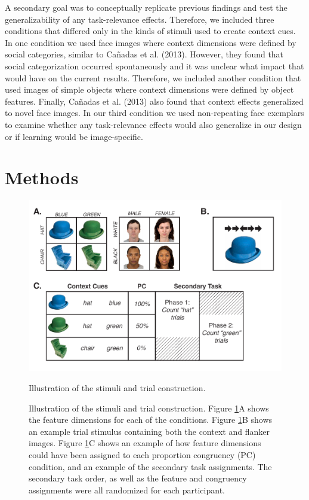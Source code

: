 \documentclass[]{DissertateCUNY}
\begin{document}
A secondary goal was to conceptually replicate previous findings and
test the generalizability of any task-relevance effects. Therefore, we
included three conditions that differed only in the kinds of stimuli
used to create context cues. In one condition we used face images where
context dimensions were defined by social categories, similar to Cañadas
et al. (2013). However, they found that social categorization occurred
spontaneously and it was unclear what impact that would have on the
current results. Therefore, we included another condition that used
images of simple objects where context dimensions were defined by object
features. Finally, Cañadas et al. (2013) also found that context effects
generalized to novel face images. In our third condition we used
non-repeating face exemplars to examine whether any task-relevance
effects would also generalize in our design or if learning would be
image-specific.

\hypertarget{methods-7}{%
\section{Methods}\label{methods-7}}

\begin{figure}
  \centering
  \includegraphics[width=5in]{figures/TRtask.pdf}
  \caption{Illustration of the stimuli and trial construction.}
  \caption*{Illustration of the stimuli and trial construction. Figure \ref{TRfigure1}A shows the feature dimensions for each of the conditions. Figure \ref{TRfigure1}B shows an example trial stimulus containing both the context and flanker images. Figure \ref{TRfigure1}C shows an example of how feature dimensions could have been assigned to each proportion congruency (PC) condition, and an example of the secondary task assignments. The secondary task order, as well as the feature and congruency assignments were all randomized for each participant.}
  \label{TRfigure1}
\end{figure}
\end{document}
